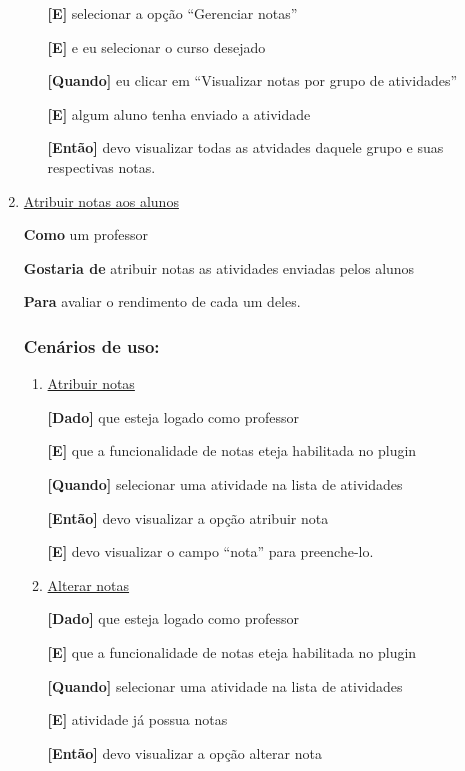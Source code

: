 \begin{enumerate}
\begin{enumerate}
\textbf{[E]} selecionar a opção ``Gerenciar notas''

\textbf{[E]} e eu selecionar o curso desejado

\textbf{[Quando]} eu clicar em ``Visualizar notas por grupo de atividades''

\textbf{[E]} algum aluno tenha enviado a atividade

\textbf{[Então]} devo visualizar todas as atvidades daquele grupo e suas respectivas notas.

\end{enumerate}

\item \underline{Atribuir notas aos alunos}

\textbf{Como} um professor

\textbf{Gostaria de} atribuir notas as atividades enviadas pelos alunos

\textbf{Para} avaliar o rendimento de cada um deles.

\subsubsection*{Cenários de uso:}

\begin{enumerate}
\item \underline{Atribuir notas}

\textbf{[Dado]} que esteja logado como professor

\textbf{[E]} que a funcionalidade de notas eteja habilitada no plugin

\textbf{[Quando]} selecionar uma atividade na lista de atividades

\textbf{[Então]} devo visualizar a opção atribuir nota

\textbf{[E]} devo visualizar o campo ``nota'' para preenche-lo.


\item \underline{Alterar notas}

\textbf{[Dado]} que esteja logado como professor

\textbf{[E]} que a funcionalidade de notas eteja habilitada no plugin

\textbf{[Quando]} selecionar uma atividade na lista de atividades

\textbf{[E]} atividade já possua notas

\textbf{[Então]} devo visualizar a opção alterar nota


\end{enumerate}
\end{enumerate}

